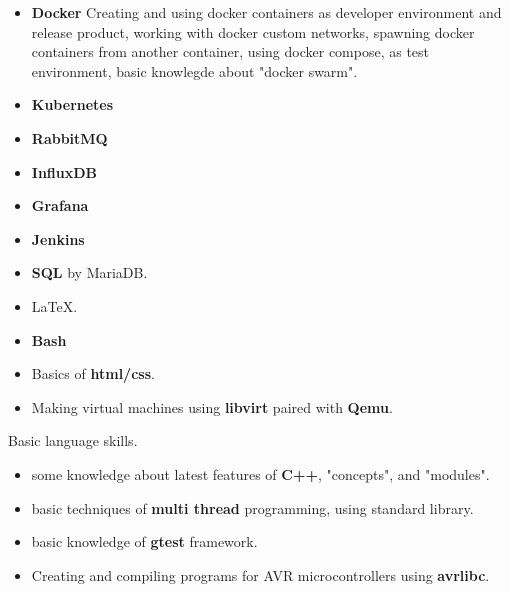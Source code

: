 \documentclass[11pt,a4paper,sans]{moderncv} %
\begin{document}
 {
    \begin{itemize}
    \item \textbf{Docker} Creating and using docker containers as developer environment and release product, working with docker custom networks, spawning docker containers from another container, using docker compose, as test environment, basic knowlegde about "docker swarm".
    \item \textbf{Kubernetes}
    \item \textbf{RabbitMQ}
    \item \textbf{InfluxDB}
    \item \textbf{Grafana}
    \item \textbf{Jenkins}
    \item \textbf{SQL} by MariaDB.
    \item \LaTeX.
    \item \textbf{Bash}
    \item Basics of \textbf{html/css}.
    \item Making virtual machines using \textbf{libvirt} paired with \textbf{Qemu}.
    \end{itemize}
}


 {
    Basic language skills.
    \begin{itemize}
    \item some knowledge about latest features of \textbf{C++}, "concepts", and "modules".
    \item basic techniques of \textbf{multi thread} programming, using standard library.
    \item basic knowledge of \textbf{gtest} framework.
    \end{itemize}
}
 {\begin{itemize}
\item Creating and compiling programs for AVR microcontrollers using \textbf{avrlibc}.
\end{itemize}}
\end{document}

